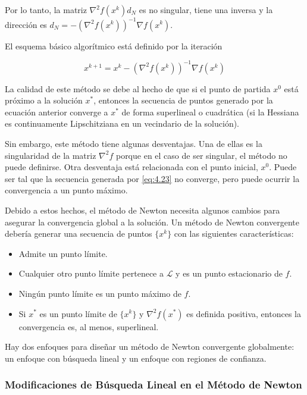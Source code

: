 Por lo tanto, la matriz $\nabla^2f(x^k)d_N$ es no singular, tiene una inversa y la dirección es $d_N = -(\nabla^2 f(x^k))^{-1}\nabla f(x^k)$.

El esquema básico algorítmico está definido por la iteración

\begin{equation}
x^{k+1} = x^k - (\nabla^2f(x^k))^{-1}\nabla f(x^k)
\label{eq:4.23}
\end{equation}

La calidad de este método se debe al hecho de que si el punto de partida $x^0$ está próximo a la solución $x^*$, entonces la secuencia de puntos generado por la ecuación anterior converge a $x^*$ de forma superlineal o cuadrática (si la Hessiana es continuamente Lipschitziana en un vecindario de la solución).

Sin embargo, este método tiene algunas desventajas. 
Una de ellas es la singularidad de la matriz $\nabla^2f$ porque en el caso de ser singular, el método no puede definirse. 
Otra desventaja está relacionada con el punto inicial, $x^0$. Puede ser tal que la secuencia generada por \ref{eq:4.23} no converge, pero puede ocurrir la convergencia a un punto máximo.

Debido a estos hechos, el método de Newton necesita algunos cambios para asegurar la convergencia global a la solución. 
Un método de Newton convergente debería generar una secuencia de puntos $\{x^k\}$ con las siguientes características:

\begin{itemize}
\item Admite un punto límite.
\item Cualquier otro punto límite pertenece a $\mathcal{L}$ y es un punto estacionario de $f$.
\item Ningún punto límite es un punto máximo de $f$.
\item Si $x^*$ es un punto límite de $\{x^k\}$ y $\nabla^2 f(x^*)$ es definida positiva, entonces la convergencia es, al menos, superlineal.
\end{itemize}

Hay dos enfoques para diseñar un método de Newton convergente globalmente: un enfoque con búsqueda lineal y un enfoque con regiones de confianza.

\subsubsection{Modificaciones de Búsqueda Lineal en el Método de Newton}

